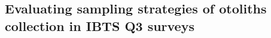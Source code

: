 \documentclass[a4paper 12pt]{article}
\numberwithin{equation}{section}
\begin{document}





\clearpage

\subsection{Evaluating sampling strategies of otoliths collection in IBTS Q3 surveys}
\label{secAp:evalutionofotoliths}
\end{document}
